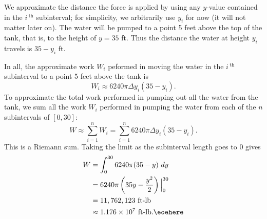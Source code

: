 \begin{example}
We approximate the distance the force is applied by using any $y$-value contained in the $i\,^\text{th}$ subinterval; for simplicity, we arbitrarily use $y_i$ for now (it will not matter later on). The water will be pumped to a point 5 feet above the top of the tank, that is, to the height of $y=35$ ft. Thus the distance the water at height $y_i$ travels is $35-y_i$ ft. 

In all, the approximate work $W_i$ peformed in moving the water in the $i\,^\text{th}$ subinterval to a point 5 feet above the tank is 
\[W_i \approx 6240\pi\Delta y_i(35-y_i).\]
To approximate the total work performed in pumping out all the water from the tank, we sum all the work $W_i$ performed in pumping the water from each of the $n$ subintervals of $[0,30]$:
\[W \approx \sum_{i=1}^n W_i = \sum_{i=1}^n 6240\pi\Delta y_i(35-y_i).\]
This is a Riemann sum. Taking the limit as the subinterval length goes to 0 gives 
\begin{align*}
W 	&=	\int_0^{30} 6240\pi(35-y)\ dy \\
		&=  6240\pi\left(35y-\frac{y^2}2\right)\Big|_0^{30} \\
		&= 	11,762,123 \ \text{ft-lb}\\
		&\approx  1.176 \times 10^7 \ \text{ft-lb}.\eoehere
\end{align*}
\end{example}


